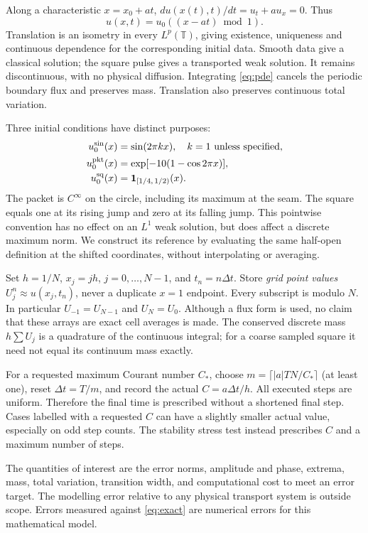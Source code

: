 Along a characteristic $x=x_0+at$, $d u(x(t),t)/dt=u_t+a u_x=0$. Thus
\begin{equation}\label{eq:exact} u(x,t)=u_0((x-at)\bmod 1).\end{equation}
Translation is an isometry in every $L^p(\mathbb T)$, giving existence, uniqueness and continuous dependence for the corresponding initial data. Smooth data give a classical solution; the square pulse gives a transported weak solution. It remains discontinuous, with no physical diffusion. Integrating \eqref{eq:pde} cancels the periodic boundary flux and preserves mass. Translation also preserves continuous total variation.

Three initial conditions have distinct purposes:
\begin{align}
 u_0^{\rm sin}(x)&=\sin(2\pi kx),\quad k=1\ \hbox{unless specified},\\
 u_0^{\rm pkt}(x)&=\exp[-10(1-\cos 2\pi x)],\\
 u_0^{\rm sq}(x)&=\mathbf1_{[1/4,\,1/2)}(x).
\end{align}
The packet is $C^\infty$ on the circle, including its maximum at the seam. The square equals one at its rising jump and zero at its falling jump. This pointwise convention has no effect on an $L^1$ weak solution, but does affect a discrete maximum norm. We construct its reference by evaluating the same half-open definition at the shifted coordinates, without interpolating or averaging.

Set $h=1/N$, $x_j=jh$, $j=0,\ldots,N-1$, and $t_n=n\Delta t$. Store \emph{grid point values} $U_j^n\approx u(x_j,t_n)$, never a duplicate $x=1$ endpoint. Every subscript is modulo $N$. In particular $U_{-1}=U_{N-1}$ and $U_N=U_0$. Although a flux form is used, no claim that these arrays are exact cell averages is made. The conserved discrete mass $h\sum U_j$ is a quadrature of the continuous integral; for a coarse sampled square it need not equal its continuum mass exactly.

For a requested maximum Courant number $C_*$, choose $m=\lceil |a|TN/C_*\rceil$ (at least one), reset $\Delta t=T/m$, and record the actual $C=a\Delta t/h$. All executed steps are uniform. Therefore the final time is prescribed without a shortened final step. Cases labelled with a requested $C$ can have a slightly smaller actual value, especially on odd step counts. The stability stress test instead prescribes $C$ and a maximum number of steps.

The quantities of interest are the error norms, amplitude and phase, extrema, mass, total variation, transition width, and computational cost to meet an error target. The modelling error relative to any physical transport system is outside scope. Errors measured against \eqref{eq:exact} are numerical errors for this mathematical model.

